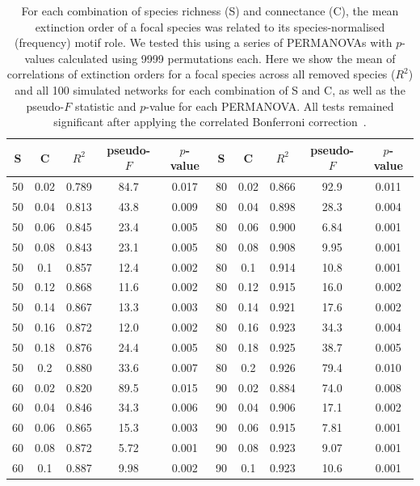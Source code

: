 \documentclass[12pt]{article}
\begin{document}
		\begin{table}[hb!]
			\caption{For each combination of species richness (S) and connectance (C), the mean extinction order of a focal species was related to its species-normalised (frequency) motif role. We tested this using a series of PERMANOVAs with $p$-values calculated using 9999 permutations each. Here we show the mean of correlations of extinction orders for a focal species across all removed species ($R^2$) and all 100 simulated networks for each combination of S and C, as well as the pseudo-$F$ statistic and $p$-value for each PERMANOVA. All tests remained significant after applying the correlated Bonferroni correction~\citep{Drezner2016}.}
			\label{permtable_freq}
			\begin{tabular}{c c | c | c c ||c c | c | c c |}
				S	&	C	&	$R^2$	&	pseudo-$F$	&	$p$-value	&	S	&	C &	$R^2$	&	pseudo-$F$	&	$p$-value\\ 
				\hline
                50&0.02&0.789&84.7&0.017	&	80&0.02&0.866&92.9&0.011\\
                50&0.04&0.813&43.8&0.009	&	80&0.04&0.898&28.3&0.004\\
                50&0.06&0.845&23.4&0.005	&	80&0.06&0.900&6.84&0.001\\
                50&0.08&0.843&23.1&0.005	&	80&0.08&0.908&9.95&0.001\\
                50&0.1&0.857&12.4&0.002	&	80&0.1&0.914&10.8&0.001\\
                50&0.12&0.868&11.6&0.002	&	80&0.12&0.915&16.0&0.002\\
                50&0.14&0.867&13.3&0.003	&	80&0.14&0.921&17.6&0.002\\
                50&0.16&0.872&12.0&0.002	&	80&0.16&0.923&34.3&0.004\\
                50&0.18&0.876&24.4&0.005	&	80&0.18&0.925&38.7&0.005\\
                50&0.2&0.880&33.6&0.007	&	80&0.2&0.926&79.4&0.010\\
                60&0.02&0.820&89.5&0.015	&	90&0.02&0.884&74.0&0.008\\
                60&0.04&0.846&34.3&0.006	&	90&0.04&0.906&17.1&0.002\\
                60&0.06&0.865&15.3&0.003	&	90&0.06&0.915&7.81&0.001\\
                60&0.08&0.872&5.72&0.001	&	90&0.08&0.923&9.07&0.001\\
                60&0.1&0.887&9.98&0.002	&	90&0.1&0.923&10.6&0.001\\

\end{tabular}
\end{table}
\end{document}
